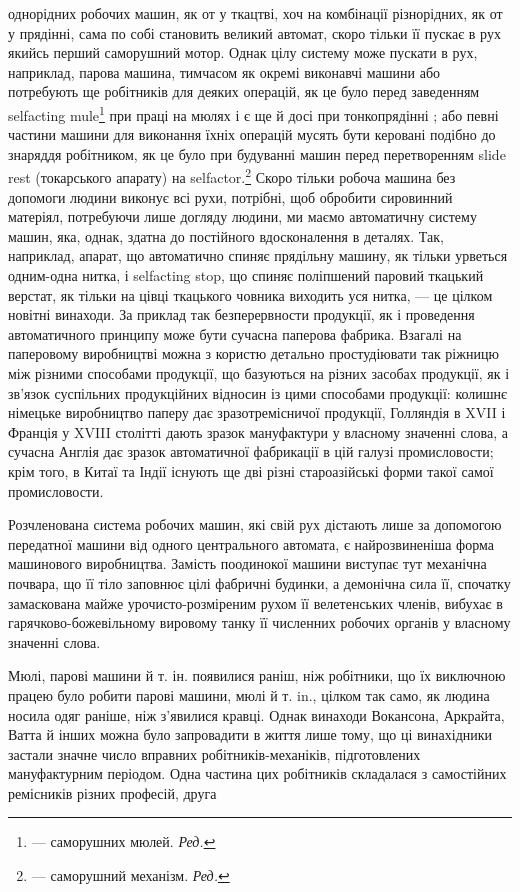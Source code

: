 однорідних робочих машин, як от у ткацтві, хоч на комбінації
різнорідних, як от у прядінні, сама по собі становить великий
автомат, скоро тільки її пускає в рух якийсь перший саморушний
мотор. Однак цілу систему може пускати в рух, наприклад,
парова машина, тимчасом як окремі виконавчі машини або потребують
ще робітників для деяких операцій, як це було перед заведенням
selfacting mule\footnote*{
— саморушних мюлей. \emph{Ред.}
} при праці на мюлях і є ще й досі при тонкопрядінні
; або певні частини машини для виконання їхніх операцій
мусять бути керовані подібно до знаряддя робітником, як це було
при будуванні машин перед перетворенням slide rest (токарського
апарату) на selfactor.\footnote*{
— саморушний механізм. \emph{Ред.}
} Скоро тільки робоча машина без допомоги
людини виконує всі рухи, потрібні, щоб обробити сировинний
матеріял, потребуючи лише догляду людини, ми маємо автоматичну
систему машин, яка, однак, здатна до постійного вдосконалення
в деталях. Так, наприклад, апарат, що автоматично
спиняє прядільну машину, як тільки урветься одним-одна нитка,
і selfacting stop, що спиняє поліпшений паровий ткацький верстат,
як тільки на цівці ткацького човника виходить уся нитка, — це
цілком новітні винаходи. За приклад так безперервности продукції,
як і проведення автоматичного принципу може бути сучасна
паперова фабрика. Взагалі на паперовому виробництві можна з користю
детально простудіювати так ріжницю між різними способами
продукції, що базуються на різних засобах продукції, як
і зв’язок суспільних продукційних відносин із цими способами
продукції: колишнє німецьке виробництво паперу дає зразотремісничої
продукції, Голляндія в XVII і Франція у XVIII столітті
дають зразок мануфактури у власному значенні слова, а сучасна
Англія дає зразок автоматичної фабрикації в цій галузі промисловости;
крім того, в Китаї та Індії існують ще дві різні староазійські
форми такої самої промисловости.

Розчленована система робочих машин, які свій рух дістають лише
за допомогою передатної машини від одного центрального автомата,
є найрозвиненіша форма машинового виробництва. Замість
поодинокої машини виступає тут механічна почвара, що її тіло
заповнює цілі фабричні будинки, а демонічна сила її, спочатку
замаскована майже урочисто-розміреним рухом її велетенських
членів, вибухає в гарячково-божевільному вировому танку її
численних робочих органів у власному значенні слова.

Мюлі, парові машини й т. ін. появилися раніш, ніж робітники,
що їх виключною працею було робити парові машини, мюлі й
т. in., цілком так само, як людина носила одяг раніше, ніж з’явилися
кравці. Однак винаходи Вокансона, Аркрайта, Ватта
й інших можна було запровадити в життя лише тому, що ці винахідники
застали значне число вправних робітників-механіків,
підготовлених мануфактурним періодом. Одна частина цих робітників
складалася з самостійних ремісників різних професій, друга